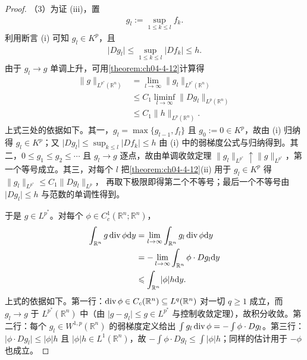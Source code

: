 \documentclass[../../main.tex]{subfiles}%
\begin{document}
\begin{proof}
（3）为证 (iii)，置
\begin{align*}
g_l:=\sup_{1\leqslant k\leqslant l}f_k .
\end{align*}
利用断言 (i) 可知 $g_l\in K^p$，且
\begin{align*}
\lvert Dg_l\rvert\leqslant\sup_{1\leqslant k\leqslant l}\lvert Df_k\rvert\leqslant h .
\end{align*}
由于 $g_l\to g$ 单调上升，可用\cref{theorem:ch04-4-12}计算得%
\begin{align*}
\lVert g\rVert_{L^{p^*}(\mathbb{R}^n)}&=\lim_{l\to\infty}\lVert g_l\rVert_{L^{p^*}(\mathbb{R}^n)}\\
&\leqslant C_1\liminf_{l\to\infty}\lVert Dg_l\rVert_{L^p(\mathbb{R}^n)}\\
&\leqslant C_1\lVert h\rVert_{L^p(\mathbb{R}^n)} .
\end{align*}
上式三处的依据如下。其一，$g_l=\max\{g_{l-1},f_l\}$ 且 $g_0:=0\in K^p$，故由 (i) 归纳得 $g_l\in K^p$；又 $\lvert Dg_l\rvert\leqslant\sup_{k\leqslant l}\lvert Df_k\rvert\leqslant h$ 由 (i) 中的弱梯度公式与归纳得到。其二，$0\leqslant g_1\leqslant g_2\leqslant\cdots$ 且 $g_l\to g$ 逐点，故由单调收敛定理 $\lVert g_l\rVert_{L^{p^*}}\uparrow\lVert g\rVert_{L^{p^*}}$，第一个等号成立。其三，对每个 $l$ 把\cref{theorem:ch04-4-12}(ii) 用于 $g_l\in K^p$ 得 $\lVert g_l\rVert_{L^{p^*}}\leqslant C_1\lVert Dg_l\rVert_{L^p}$，%
再取下极限即得第二个不等号；最后一个不等号由 $\lvert Dg_l\rvert\leqslant h$ 与范数的单调性得到。

于是 $g\in L^{p^*}$。对每个 $\phi\in C_c^1(\mathbb{R}^n;\mathbb{R}^n)$，
\begin{align*}
\int_{\mathbb{R}^n}g\operatorname{div}\phi\mathrm{d} y&=\lim_{l\to\infty}\int_{\mathbb{R}^n}g_l\operatorname{div}\phi\mathrm{d} y\\
&=-\lim_{l\to\infty}\int_{\mathbb{R}^n}\phi\cdot Dg_l\mathrm{d} y\\
&\leqslant\int_{\mathbb{R}^n}\lvert\phi\rvert h\mathrm{d} y .
\end{align*}
上式的依据如下。第一行：$\operatorname{div}\phi\in C_c(\mathbb{R}^n)\subseteq L^{q}(\mathbb{R}^n)$ 对一切 $q\geqslant1$ 成立，而 $g_l\to g$ 于 $L^{p^*}(\mathbb{R}^n)$ 中（由 $\lvert g-g_l\rvert\leqslant g\in L^{p^*}$ 与控制收敛定理），故积分收敛。第二行：每个 $g_l\in W^{1,p}(\mathbb{R}^n)$ 的弱梯度定义给出 $\int g_l\operatorname{div}\phi=-\int\phi\cdot Dg_l$。第三行：$\lvert\phi\cdot Dg_l\rvert\leqslant\lvert\phi\rvert h$ 且 $\lvert\phi\rvert h\in L^1(\mathbb{R}^n)$，故 $-\int\phi\cdot Dg_l\leqslant\int\lvert\phi\rvert h$；同样的估计用于 $-\phi$ 也成立。


\end{proof}
\end{document}
